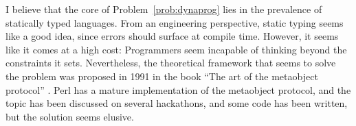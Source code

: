 I believe that the core of Problem~\ref{prob:dynaprog} lies in the
prevalence of statically typed languages. From an engineering
perspective, static typing seems like a good idea, since errors should
surface at compile time. However, it seems like it comes at a high
cost: Programmers seem incapable of thinking beyond the constraints it
sets. Nevertheless, the theoretical framework that seems to solve the
problem was proposed in 1991 in the book ``The art of the metaobject
protocol'' \cite{kiczales1991art}. Perl has a mature implementation of
the metaobject protocol, and the topic has been discussed on several
hackathons, and some code has been written, but the solution seems
elusive.
